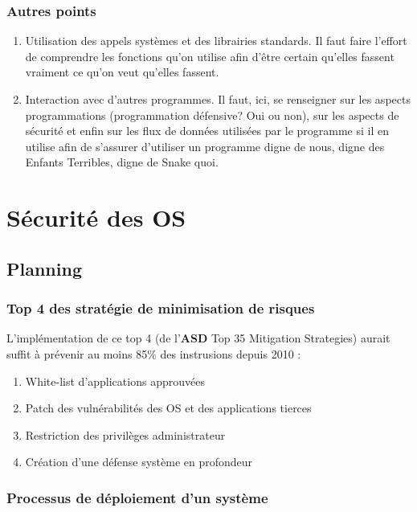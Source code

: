 \documentclass{report}
\begin{document}
\subsection{Autres points}

\begin{enumerate}
    \item Utilisation des appels systèmes et des librairies standards. Il faut faire l'effort de comprendre les fonctions qu'on utilise afin d'être certain qu'elles fassent vraiment ce qu'on veut qu'elles fassent.

    \item Interaction avec d'autres programmes. Il faut, ici, se renseigner sur les aspects programmations (programmation défensive? Oui ou non), sur les aspects de sécurité et enfin sur les flux de données utilisées par le programme si il en utilise afin de s'assurer d'utiliser un programme digne de nous, digne des Enfants Terribles, digne de Snake quoi.
\end{enumerate}

\chapter{Sécurité des OS}

\section{Planning}

\subsection{Top 4 des stratégie de minimisation de risques}

L'implémentation de ce top 4 (de l'\textbf{ASD} Top 35 Mitigation Strategies) aurait suffit à prévenir au moins 85\% des instrusions depuis 2010 :

\begin{enumerate}
    \item White-list d'applications approuvées
    \item Patch des vulnérabilités des OS et des applications tierces
    \item Restriction des privilèges administrateur
    \item Création d'une défense système en profondeur
\end{enumerate}

\subsection{Processus de déploiement d'un système}
\end{document}
